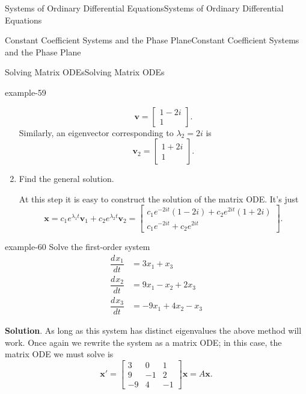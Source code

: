 \documentclass[10pt,]{book}
\numberwithin{equation}{section}
\renewcommand{\vec}[1]{\mathbf{#1}}
\newcommand{\dv}[3][]{\dfrac{d^{#1} #2}{d #3^{#1}}}
\newcommand{\amp}{&}
\begin{document}
\begin{chapterptx}{Systems of Ordinary Differential Equations}{}{Systems of Ordinary Differential Equations}{}{}
\begin{sectionptx}{Constant Coefficient Systems and the Phase Plane}{}{Constant Coefficient Systems and the Phase Plane}{}{}
\begin{subsectionptx}{Solving Matrix ODEs}{}{Solving Matrix ODEs}{}{}
\begin{example}{}{example-59}
\begin{enumerate}
\begin{equation*}
\vec{v} = \begin{bmatrix}1-2i \\ 1\end{bmatrix}.
\end{equation*}
Similarly, an eigenvector corresponding to \(\lambda_{2}=2i\) is%
\begin{equation*}
\vec{v}_{2} = \begin{bmatrix}1+2i\\1\end{bmatrix}.
\end{equation*}
%
\item\hypertarget{li-22}{}\hypertarget{p-353}{}%
Find the general solution.%
\par
\hypertarget{p-354}{}%
At this step it is easy to construct the solution of the matrix ODE. It's just%
\begin{equation*}
\vec{x} = c_{1}e^{\lambda_{1}t}\vec{v}_{1} + c_{2}e^{\lambda_{2}t}\vec{v}_{2} = \begin{bmatrix}c_{1}e^{-2it}(1-2i)+c_{2}e^{2it}(1+2i) \\ c_{1}e^{-2it}+c_{2}e^{2it}\end{bmatrix}.
\end{equation*}
%
\end{enumerate}
%
\end{example}
\begin{example}{}{example-60}%
\hypertarget{p-355}{}%
Solve the first-order system%
\begin{align*}
\dv{x_{1}}{t} \amp = 3x_{1}+x_{3}\\
\dv{x_{2}}{t} \amp = 9x_{1}-x_{2}+2x_{3}\\
\dv{x_{3}}{t} \amp = -9x_{1} + 4x_{2} - x_{3}
\end{align*}
%
\par\smallskip%
\noindent\textbf{Solution}.\hypertarget{solution-57}{}\quad%
\hypertarget{p-356}{}%
As long as this system has distinct eigenvalues the above method will work. Once again we rewrite the system as a matrix ODE; in this case, the matrix ODE we must solve is%
\begin{equation*}
\vec{x}' = \begin{bmatrix}3 \amp  0 \amp  1 \\ 9 \amp  -1 \amp  2 \\ -9 \amp  4 \amp  -1\end{bmatrix}\vec{x} = A\vec{x}.
\end{equation*}
%
\par

\end{example}
\end{subsectionptx}
\end{sectionptx}
\end{chapterptx}
\end{document}
